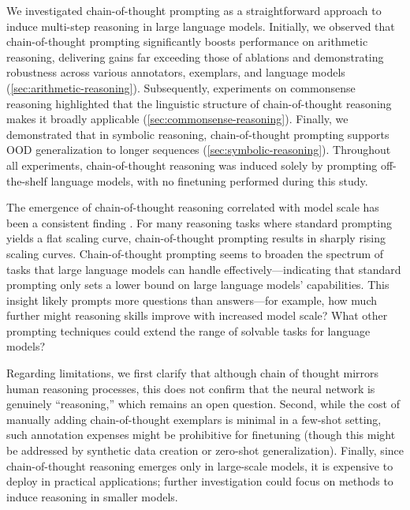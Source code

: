 We investigated chain-of-thought prompting as a straightforward approach to induce multi-step reasoning in large language models. Initially, we observed that chain-of-thought prompting significantly boosts performance on arithmetic reasoning, delivering gains far exceeding those of ablations and demonstrating robustness across various annotators, exemplars, and language models (\cref{sec:arithmetic-reasoning}). Subsequently, experiments on commonsense reasoning highlighted that the linguistic structure of chain-of-thought reasoning makes it broadly applicable (\cref{sec:commonsense-reasoning}). Finally, we demonstrated that in symbolic reasoning, chain-of-thought prompting supports OOD generalization to longer sequences (\cref{sec:symbolic-reasoning}). Throughout all experiments, chain-of-thought reasoning was induced solely by prompting off-the-shelf language models, with no finetuning performed during this study.

The emergence of chain-of-thought reasoning correlated with model scale has been a consistent finding \citep{wei2022emergent}. For many reasoning tasks where standard prompting yields a flat scaling curve, chain-of-thought prompting results in sharply rising scaling curves. Chain-of-thought prompting seems to broaden the spectrum of tasks that large language models can handle effectively—indicating that standard prompting only sets a lower bound on large language models’ capabilities. This insight likely prompts more questions than answers—for example, how much further might reasoning skills improve with increased model scale? What other prompting techniques could extend the range of solvable tasks for language models?

Regarding limitations, we first clarify that although chain of thought mirrors human reasoning processes, this does not confirm that the neural network is genuinely “reasoning,” which remains an open question. Second, while the cost of manually adding chain-of-thought exemplars is minimal in a few-shot setting, such annotation expenses might be prohibitive for finetuning (though this might be addressed by synthetic data creation or zero-shot generalization).  Finally, since chain-of-thought reasoning emerges only in large-scale models, it is expensive to deploy in practical applications; further investigation could focus on methods to induce reasoning in smaller models.

